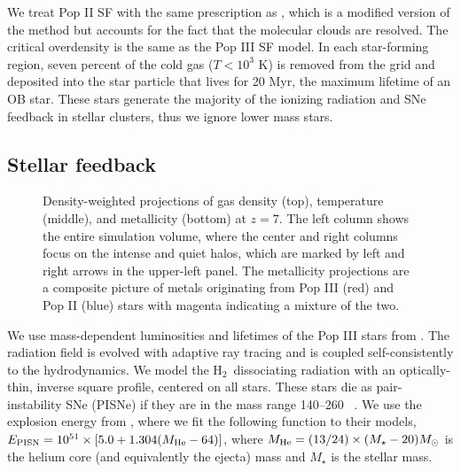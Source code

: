 \documentclass[apjl]{emulateapj}
\newcommand{\Ms}{\ifmmode{M_\odot}\else{$M_\odot$}\fi}
\newcommand{\hh}{H$_2$}
\begin{document}
%

We treat Pop II SF with the same prescription as \citet{Wise09}, which
is a modified version of the \citet{Cen92} method but accounts for the
fact that the molecular clouds are resolved.  The critical overdensity
is the same as the Pop III SF model.  In each star-forming region,
seven percent of the cold gas ($T < 10^3$ K) is removed from the grid
and deposited into the star particle that lives for 20 Myr, the
maximum lifetime of an OB star.  These stars generate the majority of
the ionizing radiation and SNe feedback in stellar clusters, thus we
ignore lower mass stars.

\subsection{Stellar feedback}

\begin{figure*}
\caption{\label{fig:projections} Density-weighted projections of gas
  density (top), temperature (middle), and metallicity (bottom) at
  $z=7$.  The left column shows the entire simulation volume, where
  the center and right columns focus on the intense and quiet halos,
  which are marked by left and right arrows in the upper-left panel.
  The metallicity projections are a composite picture of metals
  originating from Pop III (red) and Pop II (blue) stars with magenta
  indicating a mixture of the two.}
\end{figure*}

We use mass-dependent luminosities and lifetimes of the Pop III stars
from \citet{Schaerer02}.  The radiation field is evolved with adaptive
ray tracing \citep{Abel02_RT, Wise10} and is coupled self-consistently
to the hydrodynamics.  We model the \hh~dissociating radiation with an
optically-thin, inverse square profile, centered on all stars.  These
stars die as pair-instability SNe (PISNe) if they are in the mass
range 140--260 \Ms~\citep{Heger03}.  We use the explosion energy from
\citet{Heger02}, where we fit the following function to their models,
$E_{\rm PISN} = 10^{51} \times [5.0 + 1.304 (M_{\rm He} - 64)]$, where
$M_{\rm He} = (13/24) \times (M_\star - 20) \Ms$ is the helium core
(and equivalently the ejecta) mass and $M_\star$ is the stellar mass.
\end{document}

